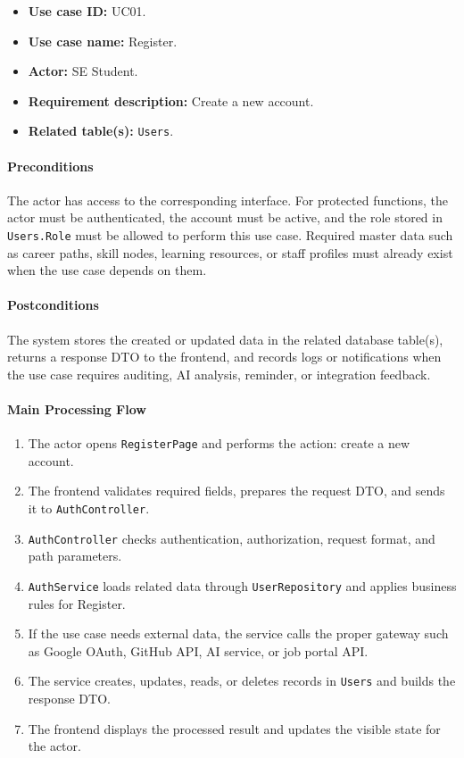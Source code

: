 \begin{itemize}
    \item \textbf{Use case ID:} UC01.
    \item \textbf{Use case name:} Register.
    \item \textbf{Actor:} SE Student.
    \item \textbf{Requirement description:} Create a new account.
    \item \textbf{Related table(s):} \texttt{Users}.
\end{itemize}

\paragraph{Preconditions}

The actor has access to the corresponding interface. For protected functions, the actor must be authenticated, the account must be active, and the role stored in \texttt{Users.Role} must be allowed to perform this use case. Required master data such as career paths, skill nodes, learning resources, or staff profiles must already exist when the use case depends on them.

\paragraph{Postconditions}

The system stores the created or updated data in the related database table(s), returns a response DTO to the frontend, and records logs or notifications when the use case requires auditing, AI analysis, reminder, or integration feedback.

\paragraph{Main Processing Flow}

\begin{enumerate}
    \item The actor opens \texttt{RegisterPage} and performs the action: create a new account.
    \item The frontend validates required fields, prepares the request DTO, and sends it to \texttt{AuthController}.
    \item \texttt{AuthController} checks authentication, authorization, request format, and path parameters.
    \item \texttt{AuthService} loads related data through \texttt{UserRepository} and applies business rules for Register.
    \item If the use case needs external data, the service calls the proper gateway such as Google OAuth, GitHub API, AI service, or job portal API.
    \item The service creates, updates, reads, or deletes records in \texttt{Users} and builds the response DTO.
    \item The frontend displays the processed result and updates the visible state for the actor.
\end{enumerate}

